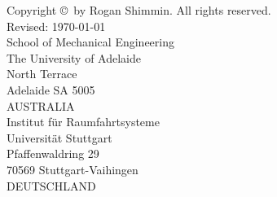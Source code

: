 \newpage\thispagestyle{empty}
{\setlength\parindent{0pt}

Copyright \copyright\the\year\ by Rogan Shimmin. All rights reserved.\\[2cm]

Revised: \today\\[2cm]

School of Mechanical Engineering\\
The University of Adelaide\\
North Terrace \\
Adelaide SA 5005\\
AUSTRALIA\\[2cm]

Institut f\"{u}r Raumfahrtsysteme\\
Universit\"{a}t Stuttgart\\
Pfaffenwaldring 29\\
70569 Stuttgart-Vaihingen\\
DEUTSCHLAND
}

